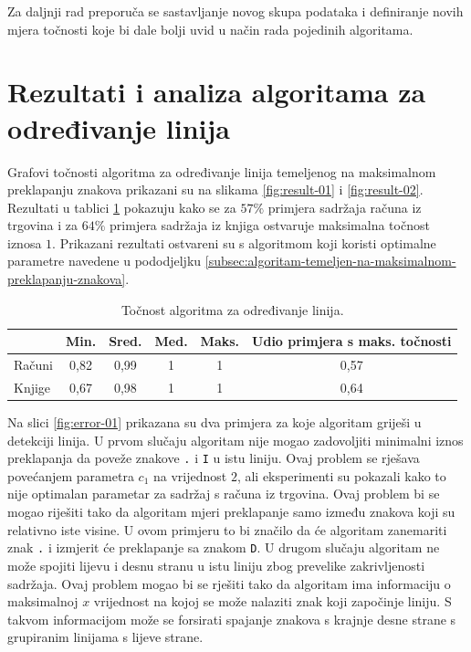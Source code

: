 \documentclass[times, utf8, zavrsni]{fer}
\begin{document}
Za daljnji rad preporuča se sastavljanje novog skupa podataka i definiranje
novih mjera točnosti koje bi dale bolji uvid u način rada pojedinih algoritama.

\pagebreak








\section{Rezultati i analiza algoritama za određivanje linija}
\label{sec:rezultati-i-analiza-algoritama-za-odredivanje-linija}
Grafovi točnosti algoritma za određivanje linija temeljenog na maksimalnom
preklapanju znakova prikazani su na slikama \ref{fig:result-01} i
\ref{fig:result-02}. Rezultati u tablici \ref{tbl:result-01} pokazuju kako se
za $57\%$ primjera sadržaja računa iz trgovina i za $64\%$ primjera sadržaja iz knjiga ostvaruje maksimalna
točnost iznosa $1$. Prikazani rezultati ostvareni su s algoritmom koji koristi
optimalne parametre navedene u pododjeljku
\ref{subsec:algoritam-temeljen-na-maksimalnom-preklapanju-znakova}.

\begin{table}[htb]
\caption{Točnost algoritma za određivanje linija.}
\label{tbl:result-01}
\centering
\begin{tabular}{lccccc} \hline
& Min. & Sred. & Med. & Maks. & Udio primjera s maks. točnosti \\ \hline
Računi & 0,82 & 0,99 & 1 & 1 & 0,57 \\
Knjige & 0,67 & 0,98 & 1 & 1 & 0,64 \\ \hline
\end{tabular}
\end{table}

Na slici \ref{fig:error-01} prikazana su dva primjera za koje algoritam griješi
u detekciji linija. U prvom slučaju algoritam nije mogao zadovoljiti minimalni
iznos preklapanja da poveže znakove \lstinline{.} i \lstinline{I} u istu
liniju. Ovaj problem se rješava povećanjem parametra $c_1$ na vrijednost $2$,
ali eksperimenti su pokazali kako to nije optimalan parametar za sadržaj s
računa iz trgovina. Ovaj problem bi se mogao riješiti tako da algoritam mjeri
preklapanje samo između znakova koji su relativno iste visine. U ovom primjeru
to bi značilo da će algoritam zanemariti znak \lstinline{.} i izmjerit će
preklapanje sa znakom \lstinline{D}. U drugom slučaju algoritam ne može spojiti
lijevu i desnu stranu u istu liniju zbog prevelike zakrivljenosti sadržaja.
Ovaj problem mogao bi se rješiti tako da algoritam ima informaciju o
maksimalnoj $x$ vrijednost na kojoj se može nalaziti znak koji započinje
liniju. S takvom informacijom može se forsirati spajanje znakova s krajnje
desne strane s grupiranim linijama s lijeve strane.
\end{document}
